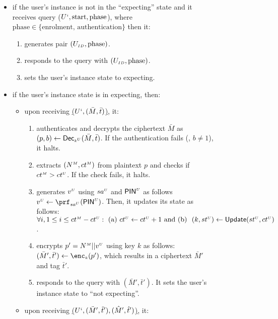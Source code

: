 \begin{figure}[H]
\begin{center}
\begin{tcolorbox}[enhanced,width=4.7in,left=0.1cm, 
    drop fuzzy shadow southwest,
    colframe=black,colback=white]
{{ \begin{itemize}[leftmargin=.4cm]
 \item if the user's instance is not in the ``expecting'' state and it receives query  \send($U^{\scriptscriptstyle i}, \text{start}, \text{phase}$), where $\text{phase}\in \{\text {enrolment, authentication}\}$ then it: 
  \begin{enumerate}
  \item generates pair $(U_{\scriptscriptstyle ID},  \text{phase})$. 
  \item responds to the query with $(U_{\scriptscriptstyle ID},  \text{phase})$. 
  \item sets the user's instance state to expecting.
  \end{enumerate}
 \item if the user's instance state is in expecting, then: 
 \begin{itemize}[leftmargin=.4cm]
 \item upon receiving \underline{\send($U^{\scriptscriptstyle i}, (\bar M, \bar t)$)}, it:
  \begin{enumerate}
  \item authenticates and decrypts the ciphertext $\bar M$ as $(p, b) \gets \mathsf{Dec}_{\scriptscriptstyle k^{\scriptscriptstyle U}}(\bar M, \bar t)$. If the authentication fails (\ie, $b\neq 1$), it halts.  
  \item extracts $({N}^{\scriptscriptstyle M}, {ct}^{\scriptscriptstyle M})$ from plaintext $p$ and checks if ${ct}^{\scriptscriptstyle M} > {ct}^{\scriptscriptstyle U} $. If the check fails, it halts. 
  \item generates ${v}^{\scriptscriptstyle U}$ using ${sa}^{\scriptscriptstyle U}$ and $\mathsf{PIN}^{\scriptscriptstyle U}$ as follows $\VC{\verifier} \gets \prf_{\VC{\salt}}(\VC{\pin})$. Then, it updates its state as follows: $\forall i, 1\leq i\leq {ct}^{\scriptscriptstyle M}- {ct}^{\scriptscriptstyle U}: \text{\ (a)\ } {ct}^{\scriptscriptstyle U} \gets {ct}^{\scriptscriptstyle U} + 1\text{\ and (b) \ } (k,  {st}^{\scriptscriptstyle U}) \gets \mathsf{Update}({st}^{\scriptscriptstyle U}, {ct}^{\scriptscriptstyle U})$. 
  \item encrypts $p'={N}^{\scriptscriptstyle M}||{v}^{\scriptscriptstyle U}$ using key $k$  as follows: $(\bar M', \bar t') \gets \enc_{\sss k}(p')$, which results in a ciphertext $\bar M'$ and tag $\bar t'$. 
  \item responds to the query with $(\bar M', \bar t')$. It sets the user's instance state to ``not expecting''.  
  \end{enumerate}
 \item  upon receiving \underline{\send($U^{\scriptscriptstyle i}, (\ddot M', \ddot t'), (\hat M', \hat t')$)}, it: 
 \begin{enumerate}

\end{enumerate}
\end{itemize}
\end{itemize}}}
\end{tcolorbox}
\end{center}
\end{figure}
